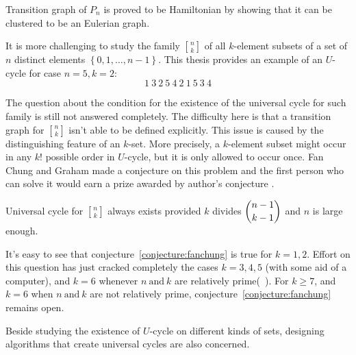 Transition graph of $P_{n}$ is proved to be Hamiltonian by showing that it can be clustered to be an Eulerian graph. 

It is more challenging to study the family ${n \brack k}$ of all $k$-element subsets of a set of $n$ distinct elements $\left\{0,1,\ldots,n-1\right\}$. This thesis provides an example of an $U$-cycle for case $n=5,k=2$:
\[1\ 3\ 2\ 5\ 4\ 2\ 1\ 5\ 3\ 4\]

The question about the condition for the existence of the universal cycle for such family is still not answered completely. The difficulty here is that a transition graph for ${n \brack k}$ isn't able to be defined explicitly. This issue is caused by the distinguishing feature of an $k$-set. More precisely, a $k$-element subset might occur in any $k!$ possible order in $U$-cycle, but it is only allowed to occur once. Fan Chung and Graham made a conjecture on this problem and the first person who can solve it would earn a prize awarded by author's conjecture .

\begin{conjecture}\label{conjecture:fanchung}
    Universal cycle for ${n \brack k}$ always exists provided $k$ divides $\dbinom{n-1}{k-1}$ and $n$ is large enough.
\end{conjecture}

It's easy to see that conjecture~\ref{conjecture:fanchung} is true for $k=1,2$. Effort on this question has just cracked completely the cases $k=3,4,5$ (with some aid of a computer), and $k=6$ whenever $n\ \mathrm{and}\ k$ are relatively prime(~\cite{hurlbert1994universal,jackson1993universal}). For $k\geq 7$, and $k=6$ when $n\ \mathrm{and}\ k$ are not relatively prime, conjecture~\ref{conjecture:fanchung} remains open. 

Beside studying the existence of $U$-cycle on different kinds of sets, designing algorithms that create universal cycles are also concerned.
